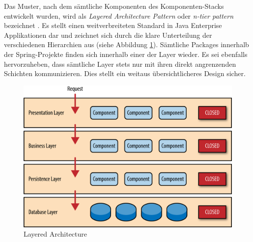 Das Muster, nach dem sämtliche Komponenten des Komponenten-Stacks entwickelt wurden, wird als \emph{Layered Architecture Pattern} oder \emph{n-tier pattern} bezeichnet \cite{oreilly-layered-arch}. Es stellt einen weitverbreiteten Standard in Java Enterprise Applikationen dar und zeichnet sich durch die klare Unterteilung der verschiedenen Hierarchien aus (siehe Abbildung \ref{fig:layeredArchitecture}). Sämtliche Packages innerhalb der Spring-Projekte finden sich innerhalb einer der Layer wieder. Es sei ebenfalls hervorzuheben, dass sämtliche Layer stets nur mit ihren direkt angrenzenden Schichten kommunizieren. Dies stellt ein weitaus übersichtlicheres Design sicher.

\begin{figure}[ht!]
	\centering
	\includegraphics[width=.7\linewidth]{kapitel/problemloesung/implementierung/_img/dataflow-overview-01}
	\caption[Layered Architecture]{Layered Architecture \cite{oreilly-layered-arch}}
	\label{fig:layeredArchitecture}
\end{figure}


